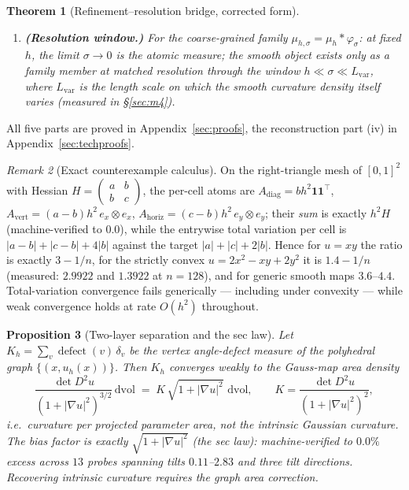 \documentclass[11pt,a4paper]{article}
\theoremstyle{plain}
\newtheorem{theorem}{Theorem}[section]
\newtheorem{proposition}[theorem]{Proposition}
\theoremstyle{definition}
\theoremstyle{remark}
\newtheorem{remark}[theorem]{Remark}
\newcommand{\dvol}{\,\mathrm{dvol}}
\begin{document}
\begin{theorem}[Refinement--resolution bridge, corrected form]
\begin{enumerate}[label=(\roman*),leftmargin=2em]
      naive three-facet patch is not the dual cell; the general statement
      requires the discrete-duality (dual-diamond) pairing.
\item \textbf{(Resolution window.)} For the coarse-grained family
      $\mu_{h,\sigma} = \mu_h * \varphi_\sigma$: at fixed $h$, the limit
      $\sigma \to 0$ is the \emph{atomic} measure; the smooth object
      exists only as a family member at matched resolution through the
      window $h \ll \sigma \ll L_{\mathrm{var}}$, where $L_{\mathrm{var}}$
      is the length scale on which the smooth curvature density itself
      varies (measured in \S\ref{sec:m4}).
\end{enumerate}
\end{theorem}

All five parts are proved in Appendix~\ref{sec:proofs}, the
reconstruction part (iv) in Appendix~\ref{sec:techproofs}.

\begin{remark}[Exact counterexample calculus]\label{rem:tvcounter}
On the right-triangle mesh of $[0,1]^2$ with Hessian
$H = \left(\begin{smallmatrix} a & b\\ b & c\end{smallmatrix}\right)$, the
per-cell atoms are $A_{\mathrm{diag}} = b h^2 \mathbf{1}\mathbf{1}^\top$,
$A_{\mathrm{vert}} = (a-b) h^2\, e_x \otimes e_x$,
$A_{\mathrm{horiz}} = (c-b) h^2\, e_y \otimes e_y$; their \emph{sum} is
exactly $h^2 H$ (machine-verified to $0.0$), while the entrywise total
variation per cell is $|a-b| + |c-b| + 4|b|$ against the target
$|a| + |c| + 2|b|$. Hence for $u = xy$ the ratio is exactly $3 - 1/n$, for
the strictly convex $u = 2x^2 - xy + 2y^2$ it is $1.4 - 1/n$ (measured:
$2.9922$ and $1.3922$ at $n=128$), and for generic smooth maps $3.6$--$4.4$.
Total-variation convergence fails generically --- including under
convexity --- while weak convergence holds at rate $O(h^2)$ throughout.
\end{remark}

\begin{proposition}[Two-layer separation and the sec law]
\label{prop:seclaw}
Let $K_h = \sum_v \operatorname{defect}(v)\,\delta_v$ be the vertex
angle-defect measure of the polyhedral graph
$\{(x, u_h(x))\}$. Then $K_h$ converges weakly to the \emph{Gauss-map area
density}
\[
\frac{\det D^2 u}{\left(1 + |\nabla u|^2\right)^{3/2}} \dvol
\;=\; K\,\sqrt{1+|\nabla u|^2}\,\dvol,
\qquad
K = \frac{\det D^2 u}{(1+|\nabla u|^2)^2},
\]
i.e.\ curvature per projected parameter area, \emph{not} the intrinsic
Gaussian curvature. The bias factor is exactly
$\sqrt{1+|\nabla u|^2}$ (the sec law): machine-verified to $0.0\%$ excess
across $13$ probes spanning tilts $0.11$--$2.83$ and three tilt
directions. Recovering intrinsic curvature requires the graph area
correction.
\end{proposition}
\end{document}
